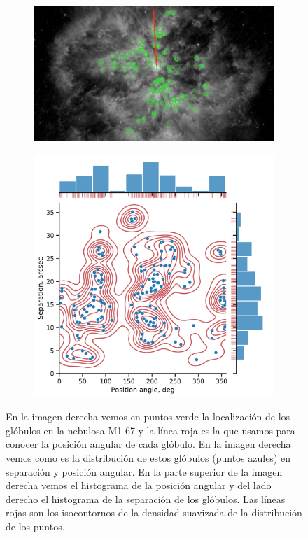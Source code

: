 \documentclass{book}
\begin{document}
\begin{figure}[htb]
    \centering  
    \begin{subfigure}[b]{0.45\linewidth}
        \includegraphics[width=\textwidth]{Nuevas imagenes finales/m1_67_glo_.png}
    \end{subfigure}
    \begin{subfigure}[b]{0.45\linewidth}
        \includegraphics[width=\textwidth]{images Chapter 2/C2_nudos_distribucion.png}
    \end{subfigure}
    \caption{En la imagen derecha vemos en puntos verde la localización de los glóbulos en la nebulosa M1-67 y la línea roja es la que usamos para conocer la posición angular de cada glóbulo. En la imagen derecha vemos como es la distribución de estos glóbulos (puntos azules) en separación y posición angular. En la parte superior de la imagen derecha vemos el histograma de la posición angular y del lado derecho el histograma de la separación de los glóbulos. Las  líneas rojas son los isocontornos de la densidad suavizada de la distribución de los puntos.} 
    \label{fig:dis_nudos}
\end{figure}
\end{document}
